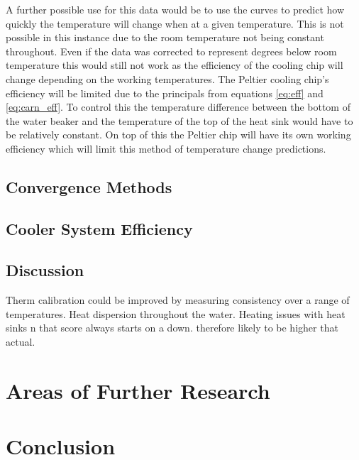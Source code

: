 \documentclass[10pt]{article}
\begin{document}
A further possible use for this data would be to use the curves to predict how quickly the temperature will change when at a given temperature. This is not possible in this instance due to the room temperature not being constant throughout. Even if the data was corrected to represent degrees below room temperature this would still not work as the efficiency of the cooling chip will change depending on the working temperatures. The Peltier cooling chip's efficiency will be limited due to the principals from equations \ref{eq:eff} and \ref{eq:carn_eff}. To control this the temperature difference between the bottom of the water beaker and the temperature of the top of the heat sink would have to be relatively constant. On top of this the Peltier chip will have its own working efficiency which will limit this method of temperature change predictions.

\subsection*{Convergence Methods}
\subsection*{Cooler System Efficiency}


\subsection*{Discussion}
Therm calibration could be improved by measuring consistency over a range of temperatures.
Heat dispersion throughout the water.
Heating issues with heat sinks n that
score always starts on a down. therefore likely to be higher that actual.

\section*{Areas of Further Research}


\section*{Conclusion}






\newpage
\appendix
\end{document}
